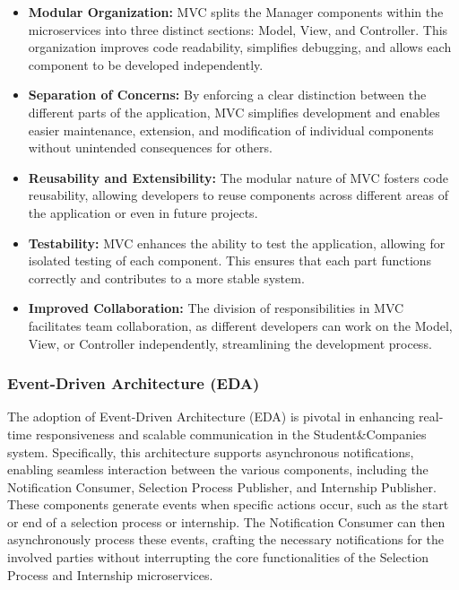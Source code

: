 \begin{itemize}
    \item \textbf{Modular Organization:} MVC splits the Manager components within the microservices into three distinct sections: Model, View, and Controller. This organization improves code readability, simplifies debugging, and allows each component to be developed independently.
    \item \textbf{Separation of Concerns:} By enforcing a clear distinction between the different parts of the application, MVC simplifies development and enables easier maintenance, extension, and modification of individual components without unintended consequences for others.
    \item \textbf{Reusability and Extensibility:} The modular nature of MVC fosters code reusability, allowing developers to reuse components across different areas of the application or even in future projects.
    \item \textbf{Testability:} MVC enhances the ability to test the application, allowing for isolated testing of each component. This ensures that each part functions correctly and contributes to a more stable system.
    \item \textbf{Improved Collaboration:} The division of responsibilities in MVC facilitates team collaboration, as different developers can work on the Model, View, or Controller independently, streamlining the development process.
\end{itemize}

\subsubsection{Event-Driven Architecture (EDA)}

The adoption of Event-Driven Architecture (EDA) is pivotal in enhancing real-time responsiveness and scalable communication in the Student\&Companies system. Specifically, this architecture supports asynchronous notifications, enabling seamless interaction between the various components, including the Notification Consumer, Selection Process Publisher, and Internship Publisher. These components generate events when specific actions occur, such as the start or end of a selection process or internship. The Notification Consumer can then asynchronously process these events, crafting the necessary notifications for the involved parties without interrupting the core functionalities of the Selection Process and Internship microservices.

